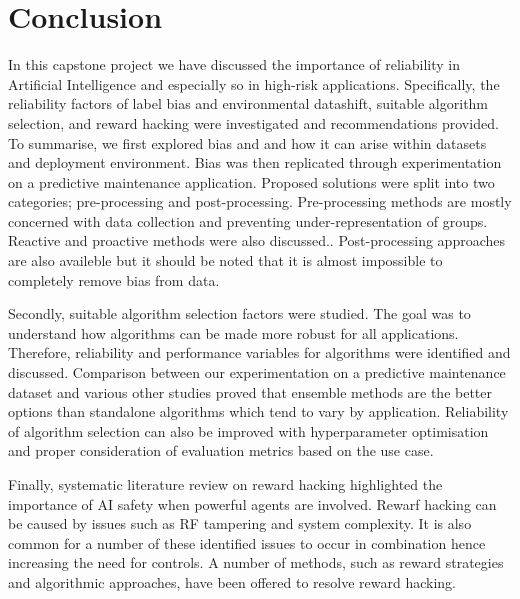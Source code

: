 \chapter{Conclusion}
In this capstone project we have discussed the importance of reliability in Artificial Intelligence 
and especially so in high-risk applications.
Specifically, the reliability factors of label bias and environmental datashift, suitable algorithm selection,
and reward hacking were investigated and recommendations provided.
To summarise, we first explored bias and and how it can arise within datasets and deployment environment.
Bias was then replicated through experimentation on a predictive maintenance application. 
Proposed solutions were split into two categories; pre-processing and post-processing.
Pre-processing methods are mostly concerned with data collection and preventing under-representation of groups.
Reactive and proactive methods were also discussed..
Post-processing approaches are also availeble but it should be noted that it is almost impossible to completely remove 
bias from data.

Secondly, suitable algorithm selection factors were studied. The goal was to understand how algorithms can be made more
robust for all applications. Therefore, reliability and performance variables for algorithms were identified and discussed.
Comparison between our experimentation on a predictive maintenance dataset and various other studies proved that ensemble methods 
are the better options than standalone algorithms which tend to vary by application. 
Reliability of algorithm selection can also be improved with hyperparameter optimisation and proper consideration of 
evaluation metrics based on the use case.

Finally, systematic literature review on reward hacking highlighted the importance of AI safety when powerful agents
are involved. Rewarf hacking can be caused by issues such as RF tampering and system complexity. 
It is also common for a number of these identified issues to occur in combination hence increasing the need for controls.
A number of methods, such as reward strategies and algorithmic approaches, have been offered to resolve reward hacking.